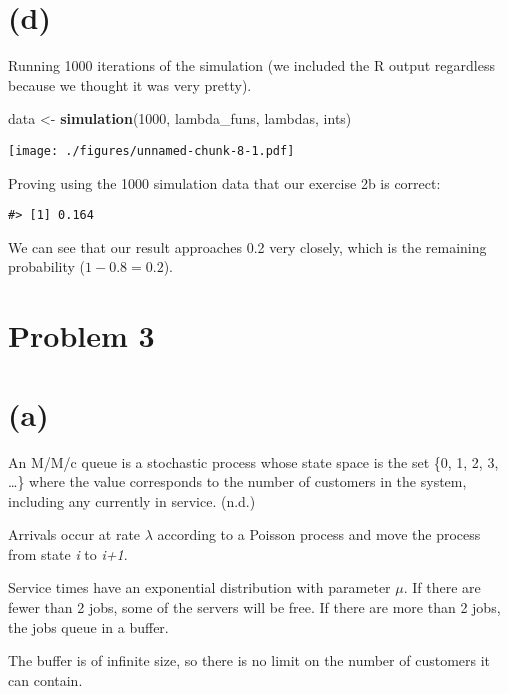 \documentclass[]{article}
\newenvironment{Shaded}{\begin{snugshade}}{\end{snugshade}}
\newcommand{\DecValTok}[1]{\textcolor[rgb]{0.00,0.00,0.81}{#1}}
\newcommand{\KeywordTok}[1]{\textcolor[rgb]{0.13,0.29,0.53}{\textbf{#1}}}
\newcommand{\NormalTok}[1]{#1}
\newcommand{\StringTok}[1]{\textcolor[rgb]{0.31,0.60,0.02}{#1}}
\begin{document}
\newpage

\hypertarget{d}{%
\section{(d)}\label{d}}

Running 1000 iterations of the simulation (we included the R output
regardless because we thought it was very pretty).

\begin{Shaded}
\begin{Highlighting}[]
\NormalTok{data <-}\StringTok{ }\KeywordTok{simulation}\NormalTok{(}\DecValTok{1000}\NormalTok{, lambda_funs, lambdas, ints)}
\end{Highlighting}
\end{Shaded}

\texttt{[image: ./figures/unnamed-chunk-8-1.pdf]}

Proving using the 1000 simulation data that our exercise 2b is correct:

\begin{verbatim}
#> [1] 0.164
\end{verbatim}

We can see that our result approaches 0.2 very closely, which is the
remaining probability (\(1-0.8 = 0.2\)).

\hypertarget{problem-3}{%
\section{Problem 3}\label{problem-3}}

\hypertarget{a-1}{%
\section{(a)}\label{a-1}}

An M/M/c queue is a stochastic process whose state space is the set \{0,
1, 2, 3, \ldots{}\} where the value corresponds to the number of
customers in the system, including any currently in service. (n.d.)

Arrivals occur at rate \(\lambda\) according to a Poisson process and
move the process from state \emph{i} to \emph{i+1}.

Service times have an exponential distribution with parameter \(\mu\).
If there are fewer than 2 jobs, some of the servers will be free. If
there are more than 2 jobs, the jobs queue in a buffer.

The buffer is of infinite size, so there is no limit on the number of
customers it can contain.
\end{document}
